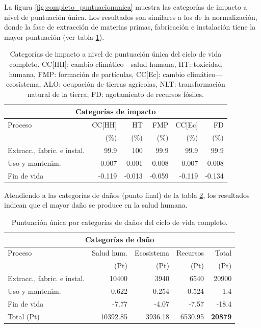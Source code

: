La figura \ref{fig:completo_puntuacionunica} muestra las categorías de impacto a nivel de puntuación única. Los resultados son similares a los de la normalización, donde la fase de extracción de materias primas, fabricación e instalación tiene la mayor puntuación (ver tabla \ref{categoriasimpactocompletopuntunica}).

\begin{table}[!htb]
\centering
\begin{tabular}{p{4cm}rrrrr}
\toprule
\multicolumn{6}{c}{Categorías de impacto}\\
\midrule
Proceso & CC[HH] & HT & FMP & CC[Ec] & FD\\
 &  (\%) & (\%) & (\%) & (\%) & (\%)\\
\midrule
Extracc., fabric. e instal. & 99.9 & 100 & 99.9 & 99.9 & 99.9\\
Uso y mantenim. & 0.007 & 0.001 & 0.008 & 0.007 & 0.008\\
Fin de vida & -0.119 & -0.013 & -0.059 & -0.119 & -0.134\\
\bottomrule
\end{tabular}
\caption[Categorías de impacto a nivel de puntuación única del ciclo de vida completo.]{Categorías de impacto a nivel de puntuación única del ciclo de vida completo. CC[HH]: cambio climático—salud humana, HT: toxicidad humana, FMP: formación de partículas, CC[Ec]: cambio climático—ecosistema, ALO: ocupación de tierras agrícolas, NLT: transformación natural de la tierra, FD: agotamiento de recursos fósiles.}
\label{categoriasimpactocompletopuntunica}
\end{table}

Atendiendo a las categorías de daños (punto final) de la tabla \ref{categoriasdanoscompleto}, los resultados indican que el mayor daño se produce en la salud humana.

\begin{table}[!htb]
\centering
\begin{tabular}{p{6cm}rrrr}
\toprule
\multicolumn{5}{c}{Categorías de daño}\\
\midrule
Proceso & Salud hum. & Ecosistema & Recursos & Total\\
 & (Pt) & (Pt) &  (Pt) & (Pt)\\
\midrule
Extracc., fabric. e instal. & 10400 & 3940 & 6540 & 20900\\
Uso y mantenim. & 0.622 & 0.254 & 0.524 & 1.4\\
Fin de vida & -7.77 & -4.07 & -7.57 & -18.4\\
\midrule
Total (Pt) & 10392.85 & 3936.18 & 6530.95 & \textbf{20879}\\
\bottomrule
\end{tabular}
\caption{Puntuación única por categorías de daños del ciclo de vida completo.}
\label{categoriasdanoscompleto}
\end{table}

